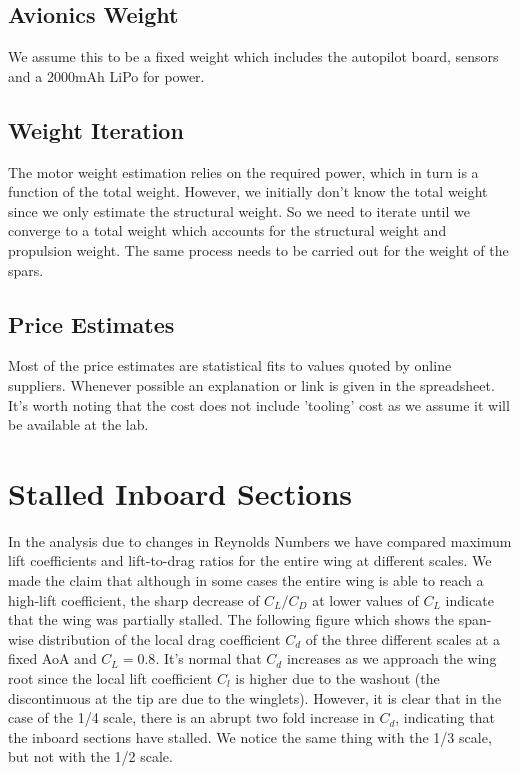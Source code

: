 \documentclass[titlepage,10pt]{article}
\begin{document}
\subsection{Avionics Weight}
We assume this to be a fixed weight which includes the autopilot board, sensors and a 2000mAh LiPo for power.


\subsection{Weight Iteration}
The motor weight estimation relies on the required power, which in turn is a function of the total weight. However, we initially don't know the total weight since we only estimate the structural weight. So we need to iterate until we converge to a total weight which accounts for the structural weight and propulsion weight. The same process needs to be carried out for the weight of the spars.

\subsection{Price Estimates}
Most of the price estimates are statistical fits to values quoted by online suppliers. Whenever possible an explanation or link is given in the spreadsheet. It's worth noting that the cost does not include 'tooling' cost as we assume it will be available at the lab.


\newpage	
\section{Stalled Inboard Sections}
\label{app:stalled}
In the analysis due to changes in Reynolds Numbers we have compared maximum lift coefficients and lift-to-drag ratios for the entire wing at different scales. We made the claim that although in some cases the entire wing is able to reach a high-lift coefficient, the sharp decrease of $C_L/C_D$ at lower values of $C_L$ indicate that the wing was partially stalled. The following figure which shows the span-wise distribution of the local drag coefficient $C_d$ of the three different scales at a fixed AoA and $C_L=0.8$. It's normal that $C_d$ increases as we approach the wing root since the local lift coefficient $C_l$ is higher due to the washout (the discontinuous at the tip are due to the winglets). However, it is clear that in the case of the 1/4 scale, there is an abrupt two fold increase in $C_d$, indicating that the inboard sections have stalled. We notice the same thing with the 1/3 scale, but not with the 1/2 scale.
\end{document}
